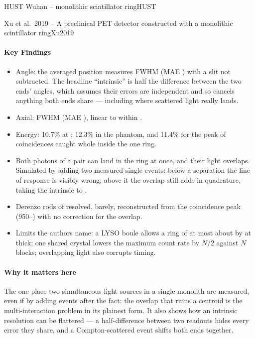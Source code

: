 \begin{programnote}{HUST Wuhan -- monolithic scintillator ring}{HUST}
\begin{papernote}{Xu et al.\ 2019 -- A preclinical PET detector constructed with a monolithic scintillator ring}{Xu2019}
\paragraph{Key Findings}
\begin{itemize}
	\item Angle: the averaged position measures  FWHM (MAE )
		with a  slit not subtracted. The headline 
		``intrinsic'' is half the difference between the two ends' angles, which
		assumes their errors are independent and so cancels anything both ends
		share --- including where scattered light really lands.
	\item Axial:  FWHM (MAE ), linear to within .
	\item Energy: 10.7\% at ; 12.3\% in the phantom, and 11.4\% for
		the  peak of coincidences caught whole inside the one ring.
	\item Both photons of a pair can land in the ring at once, and their light
		overlaps. Simulated by adding two measured single events: below a
		 separation the line of response is visibly wrong; above it
		the overlap still adds  in quadrature, taking the intrinsic 
		to .
	\item Derenzo rods of  resolved,  barely, reconstructed from
		the  coincidence peak (950--) with no correction for
		the overlap.
	\item Limits the authors name: a LYSO boule allows a ring of at most about
		 by  at  thick; one shared crystal lowers the
		maximum count rate by $N/2$ against $N$ blocks; overlapping light also
		corrupts timing.
\end{itemize}

\paragraph{Why it matters here}
The one place two simultaneous light sources in a single monolith are
measured, even if by adding events after the fact: the overlap that ruins a
centroid is the multi-interaction problem in its plainest form. It also shows
how an intrinsic resolution can be flattered --- a half-difference between two
readouts hides every error they share, and a Compton-scattered event shifts
both ends together.


\end{papernote}
\end{programnote}
